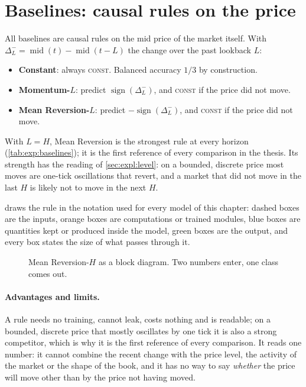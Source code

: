 \section{Baselines: causal rules on the price}
\label{sec:models:baselines}

All baselines are causal rules on the mid price of the market itself.  With
$\Delta^{-}_{L} = \operatorname{mid}(t) - \operatorname{mid}(t-L)$ the change over the
past lookback $L$:
\begin{itemize}[nosep]
  \item \textbf{Constant}: always \textsc{const}.  Balanced accuracy $1/3$ by construction.
  \item \textbf{Momentum-$L$}: predict $\operatorname{sign}(\Delta^{-}_{L})$, and \textsc{const}
  if the price did not move.
  \item \textbf{Mean Reversion-$L$}: predict $-\operatorname{sign}(\Delta^{-}_{L})$, and
  \textsc{const} if the price did not move.
\end{itemize}
With $L = H$, Mean Reversion is the strongest rule at every horizon
(\cref{tab:exp:baselines}); it is the first reference of every comparison in the thesis.
Its strength has the reading of \cref{sec:expl:level}: on a bounded, discrete price most
moves are one-tick oscillations that revert, and a market that did not move in the last $H$
is likely not to move in the next $H$.

 draws the rule in the notation used for every model of this
chapter: dashed boxes are the inputs, orange boxes are computations or trained modules,
blue boxes are quantities kept or produced inside the model, green boxes are the output,
and every box states the size of what passes through it.

\begin{figure}[t]
\centering

\caption{Mean Reversion-$H$ as a block diagram.  Two numbers enter, one class comes out.}
\label{fig:models:rule}
\end{figure}

\paragraph{Advantages and limits.}  A rule needs no training, cannot leak, costs nothing
and is readable; on a bounded, discrete price that mostly oscillates by one tick it is
also a strong competitor, which is why it is the first reference of every comparison.  It
reads one number: it cannot combine the recent change with the price level, the activity
of the market or the shape of the book, and it has no way to say \emph{whether} the price
will move other than by the price not having moved.

